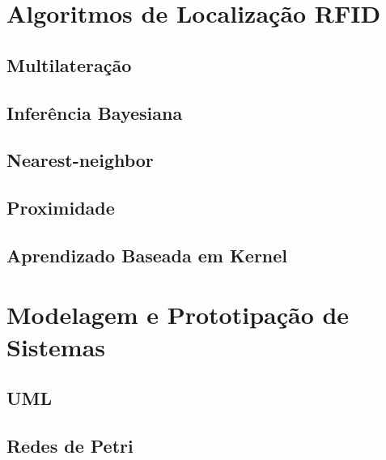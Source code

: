 \section{Algoritmos de Localização RFID}
    \subsection{Multilateração}
    \subsection{Inferência Bayesiana}
    \subsection{Nearest-neighbor}
    \subsection{Proximidade}
    \subsection{Aprendizado Baseada em Kernel}
\section{Modelagem e Prototipação de Sistemas}
    \subsection{UML}
    \subsection{Redes de Petri}